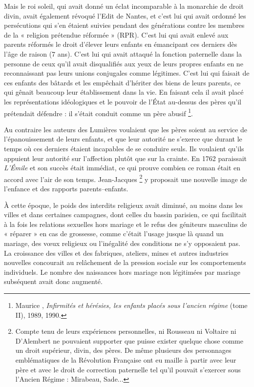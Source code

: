  Mais le roi soleil, qui avait donné un éclat incomparable à la monarchie de droit divin, avait également révoqué l'Edit de Nantes, et c'est lui qui avait ordonné les persécutions qui s'en étaient suivies pendant des générations contre les membres de la « {religion prétendue réformée} » (RPR).  C'est lui qui avait enlevé aux parents réformés le droit d'élever leurs enfants en émancipant ces derniers dès l'âge de raison (7 ans). C'est lui qui avait attaqué la fonction paternelle dans la personne de ceux qu'il avait disqualifiés aux yeux de leurs propres enfants en ne reconnaissant pas leurs unions conjugales comme légitimes. C'est lui qui faisait de ces enfants des bâtards et les empêchait d'hériter des biens de leurs parents, ce qui gênait beaucoup leur établissement dans la vie. En faisant cela il avait placé les représentations idéologiques et le pouvoir de l'État au-dessus des pères qu'il prétendait défendre : il s'était conduit comme un père abusif
\footnote{Maurice , \emph{Infirmités et hérésies, les enfants placés sous l'ancien régime} (tome II), 1989, 1990.}.


 Au contraire les auteurs des Lumières voulaient que les pères soient au service de l'épanouissement de leurs enfants, et que leur autorité ne s'exerce que durant le temps où ces derniers étaient incapables de se conduire seuls. Ils voulaient qu'ils appuient leur autorité sur l'affection plutôt que sur la crainte. En 1762 paraissait \emph{L'Émile} et son succès était immédiat, ce qui prouve combien ce roman était en accord avec l'air de son temps. Jean-Jacques  
\footnote{Compte tenu de leurs expériences personnelles, ni Rousseau ni Voltaire ni D'Alembert ne pouvaient supporter que puisse exister quelque chose comme un droit supérieur, divin, des pères. De même plusieurs des personnages emblématiques de la Révolution Française ont eu maille à partir avec leur père et avec le droit de correction paternelle tel qu'il pouvait s'exercer sous l'Ancien Régime : Mirabeau, Sade...} 
y proposait une nouvelle image de l'enfance et des rapports parents--enfants. 


 À cette époque, le poids des interdits religieux avait diminué, au moins dans les villes et dans certaines campagnes, dont celles du bassin parisien, ce qui facilitait à la fois les relations sexuelles hors mariage et le refus des géniteurs masculins de « réparer » en cas de grossesse, comme c'était l'usage jusque là quand un mariage, des vœux religieux ou l'inégalité des conditions ne s'y opposaient pas. La croissance des villes et des fabriques, ateliers, mines et autres industries nouvelles concourait au relâchement de la pression sociale sur les comportements individuels. Le nombre des naissances hors mariage non légitimées par mariage subséquent avait donc augmenté. 

